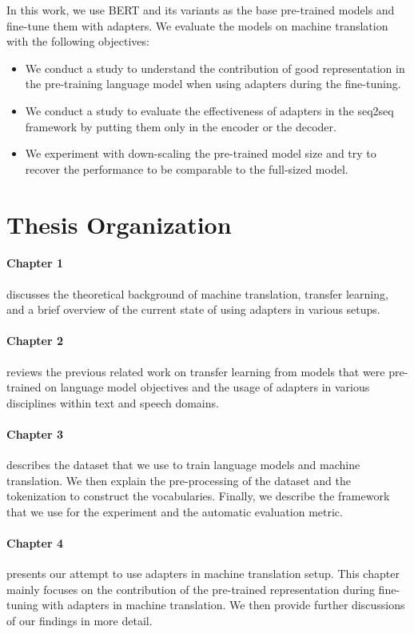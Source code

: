 In this work, we use BERT and its variants as the base pre-trained models and fine-tune them with adapters. We evaluate the models on machine translation with the following objectives:
\begin{itemize}
    \item We conduct a study to understand the contribution of good representation in the pre-training language model when using adapters during the fine-tuning.
    \item We conduct a study to evaluate the effectiveness of adapters in the seq2seq framework by putting them only in the encoder or the decoder.
    \item We experiment with down-scaling the pre-trained model size and try to recover the performance to be comparable to the full-sized model.
\end{itemize}

\section*{Thesis Organization}

\paragraph{Chapter 1} discusses the theoretical background of machine translation, transfer learning, and a brief overview of the current state of using adapters in various setups.

\paragraph{Chapter 2} reviews the previous related work on transfer learning from models that were pre-trained on language model objectives and the usage of adapters in various disciplines within text and speech domains.

\paragraph{Chapter 3} describes the dataset that we use to train language models and machine translation. We then explain the pre-processing of the dataset and the tokenization to construct the vocabularies. Finally, we describe the framework that we use for the experiment and the automatic evaluation metric.

\paragraph{Chapter 4} presents our attempt to use adapters in machine translation setup. This chapter mainly focuses on the contribution of the pre-trained representation during fine-tuning with adapters in machine translation. We then provide further discussions of our findings in more detail.

